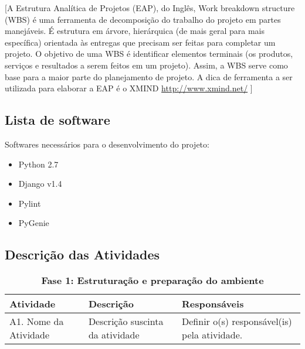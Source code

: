 [A Estrutura Analítica de Projetos (EAP), do Inglês, Work breakdown structure (WBS) é uma ferramenta de decomposição do trabalho do projeto em partes manejáveis. É estrutura em árvore, hierárquica (de mais geral para mais específica) orientada às entregas que precisam ser feitas para completar um projeto.
O objetivo de uma WBS é identificar elementos terminais (os produtos, serviços e resultados a serem feitos em um projeto). Assim, a WBS serve como base para a maior parte do planejamento de projeto.
A dica de ferramenta a ser utilizada para elaborar a EAP é o XMIND 
\url{http://www.xmind.net/} ]


\subsection{Lista de software} %
\label{sub:lista_de_software}

Softwares necessários para o desenvolvimento do projeto:
\begin{itemize}
	\item Python 2.7
	\item Django v1.4
	\item Pylint
	\item PyGenie
\end{itemize}


\subsection{Descrição das Atividades} %
\label{sub:descri_o_das_atividades}

\begin{table}[htbp]
\centering
\caption{\textbf{Fase 1: Estruturação e preparação do ambiente}}
\begin{tabular}{|p{2.5cm}|p{10cm}|p{2.5cm}|}
\hline
\textbf{Atividade} & \textbf{Descrição} & \textbf{Responsáveis} \\ \hline
A1. Nome da Atividade & Descrição suscinta da atividade & Definir o(s) responsável(is) pela atividade. \\ \hline
\end{tabular}
\label{}
\end{table}


